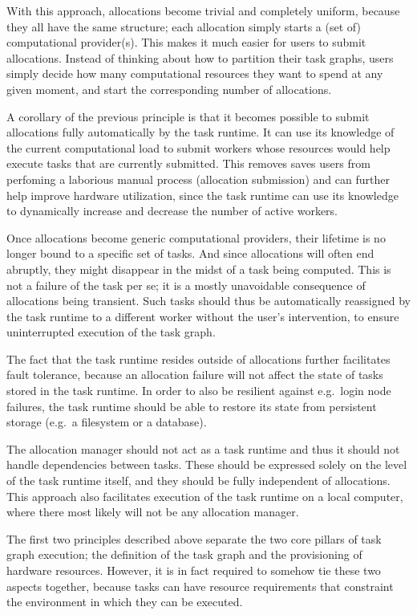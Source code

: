 \begin{description}[wide=0pt]
		With this approach, allocations become trivial and completely uniform, because they all have the
		same structure; each allocation simply starts a (set of) computational provider(s). This makes it
		much easier for users to submit allocations. Instead of thinking about how to partition their task
		graphs, users simply decide how many computational resources they want to spend at any given
		moment, and start the corresponding number of allocations.
	\item[Allocations are submitted automatically] A corollary of the previous principle is that it becomes possible to submit allocations fully
		automatically by the task runtime. It can use its knowledge of the current computational load to
		submit workers whose resources would help execute tasks that are currently submitted. This removes
		saves users from perfoming a laborious manual process (allocation submission) and can further help
		improve hardware utilization, since the task runtime can use its knowledge to dynamically increase
		and decrease the number of active workers.
	\item[Failed tasks are retried automatically] Once allocations become generic computational providers, their lifetime is no longer bound to a
		specific set of tasks. And since allocations will often end abruptly, they might disappear in the
		midst of a task being computed. This is not a failure of the task per se; it is a mostly
		unavoidable consequence of allocations being transient. Such tasks should thus be automatically
		reassigned by the task runtime to a different worker without the user's intervention, to ensure
		uninterrupted execution of the task graph.

		The fact that the task runtime resides outside of allocations further facilitates fault tolerance,
		because an allocation failure will not affect the state of tasks stored in the task runtime. In
		order to also be resilient against e.g.\ login node failures, the task runtime should be able to
		restore its state from persistent storage (e.g.\ a filesystem or a database).
	\item[Dependencies are independent of allocations] The allocation manager should not act as a task runtime and thus it should not handle dependencies
		between tasks. These should be expressed solely on the level of the task runtime itself, and they
		should be fully independent of allocations. This approach also facilitates execution of the task
		runtime on a local computer, where there most likely will not be any allocation manager.
	\item[Tasks are paired with workers using abstract resources] The first two principles described above separate the two core pillars of task graph execution; the
		definition of the task graph and the provisioning of hardware resources. However, it is in fact
		required to somehow tie these two aspects together, because tasks can have resource requirements
		that constraint the environment in which they can be executed.


\end{description}
